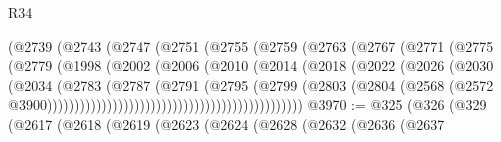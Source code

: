 \begin{lexlean}{R34}
\begin{coremodule}
                                      (@2739
                                        (@2743
                                          (@2747
                                            (@2751
                                              (@2755
                                                (@2759
                                                  (@2763
                                                    (@2767
                                                      (@2771
                                                        (@2775
                                                          (@2779
                                                            (@1998
                                                              (@2002
                                                                (@2006
                                                                  (@2010
                                                                    (@2014
                                                                      (@2018
                                                                        (@2022
                                                                          (@2026
                                                                            (@2030
                                                                              (@2034
                                                                                (@2783
                                                                                  (@2787
                                                                                    (@2791
                                                                                      (@2795
                                                                                        (@2799
                                                                                          (@2803
                                                                                            (@2804
                                                                                              (@2568
                                                                                                (@2572
                                                                                                  @3900)))))))))))))))))))))))))))))))))))))))))))))))
@3970 := @325
    (@326
      (@329
        (@2617
          (@2618
            (@2619
              (@2623
                (@2624
                  (@2628
                    (@2632
                      (@2636
                        (@2637

\end{coremodule}
\end{lexlean}
